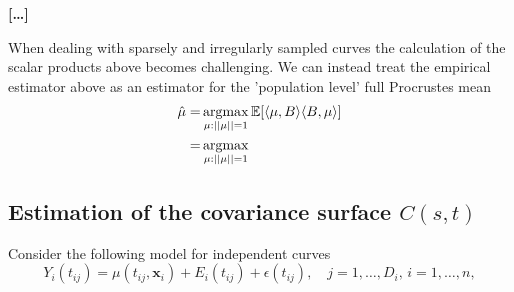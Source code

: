 \textbf{[\dots]}

When dealing with sparsely and irregularly sampled curves the calculation of the scalar products above becomes challenging.
We can instead treat the empirical estimator above as an estimator for the 'population level' full Procrustes mean
\begin{align*}
\hat{\mu} =& \operatorname*{argmax}_{\mu:||\mu||=1} \mathbb{E}[\langle \mu, B \rangle \langle B,\mu \rangle]\\
  =& \operatorname*{argmax}_{\mu:||\mu||=1}
\end{align*}

\subsection{Estimation of the covariance surface $C(s,t)$}
Consider the following model for independent curves
\begin{equation}
  Y_i(t_{ij}) = \mu(t_{ij}, \mathbf{x}_i) + E_i(t_{ij}) + \epsilon(t_{ij}),
    \quad j = 1,\dots,D_i, \, i = 1,\dots,n,
\end{equation}
